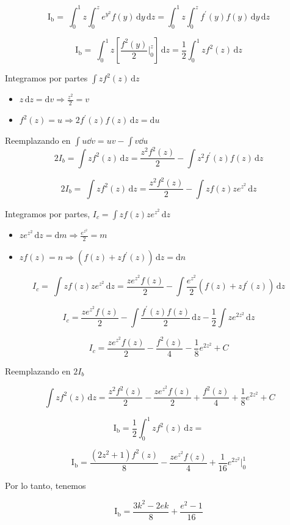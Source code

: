 {$$
\mathrm{I_b}= \ \int_{0}^{ 1 } z \int_{0}^{ z } e^{y^2} f(y) \,  \mathrm{d} y \,  \mathrm{d} z  =\int_0^1 z \int_0^z f^{'}(y)f(y)\, \mathrm{d} y \, \mathrm{d } z     
$$

$$ 
\mathrm{I_b}= \ \int_{0}^{ 1 } z \left[ \frac{f^2(y)}{2} \bigg \rvert_0^z \right]  \,  \mathrm{d} z  =\frac{1}{2}\int_0^1 z f^2(z)  \, \mathrm{d } z     
$$


Integramos por partes  $\displaystyle \int zf^2(z) \, \mathrm{d} z$
 \begin{itemize}
 	\item[] $z\, \mathrm{d} z=\mathrm{d} v\Rightarrow \frac{z^2}{2}=v$
 	\item[] $ f^2(z)=u \Rightarrow 2f^{'}(z) f(z) \, \mathrm{d} z =\mathrm{d}u$
 \end{itemize}

Reemplazando en $\int u \dd{v}=uv-\int v \dd{u}$
$$
2I_b= \int zf^2(z) \, \mathrm{d} z=\frac{z^2 f^2(z)}{2}- \int z^2 f^{'}(z) f(z) \, \mathrm{d} z 
$$

$$
2I_b=\ \int zf^2(z) \, \mathrm{d} z=\frac{z^2 f^2(z)}{2}- \int z f(z) z e^{z^2}  \, \mathrm{d} z 
$$ 

Integramos por partes, $\displaystyle I_c= \int z f(z) z e^{z^2} \, \mathrm{d} z$

 \begin{itemize}
	\item[] $z e^{z^2}\, \mathrm{d} z=\mathrm{d} m\Rightarrow \frac{ e^{z^2}}{2}=m$
	\item[] $zf(z)=n \Rightarrow (f(z)+zf^{'}(z))\, \mathrm{d} z =\mathrm{d}n$
\end{itemize}
 
$$
I_c=\ \int z f(z) z e^{z^2} \, \mathrm{d} z=\frac{ze^{z^2}f(z)}{2}-\int \frac{e^{z^2}}{2} \left(f(z)+zf^{'}(z) \right) \, \mathrm{d} z 
$$

$$
I_c=\frac{ze^{z^2}f(z)}{2}-\int \frac{f^{'}(z)f(z)}{2} \, \mathrm{d} z -\frac{1}{2} \int z e^{2z^2}  \, \mathrm{d} z 
$$

$$
I_c=\frac{ze^{z^2}f(z)}{2}- \frac{f^2(z)}{4}  -\frac{1}{8}  e^{2z^2} +C
$$

Reemplazando en $2I_b$

$$
\ \int zf^2(z) \, \mathrm{d} z=\frac{z^2 f^2(z)}{2}- \frac{ze^{z^2}f(z)}{2}+ \frac{f^2(z)}{4}  +\frac{1}{8}  e^{2z^2} +C
$$

$$ 
\mathrm{I_b}= \frac{1}{2}\int_0^1 z f^2(z)  \, \mathrm{d } z  =   
$$

$$ 
\mathrm{I_b}=   \frac{(2z^2+1) f^2(z)}{8}- \frac{ze^{z^2}f(z)}{4}  +\frac{1}{16} e^{2z^2} 
\bigg \rvert_0^1 
$$

Por lo tanto, tenemos

\begin{LnxRptaBox}
$$ 
\mathrm{I_b}=\frac{3k^2-2ek}{8}+\frac{e^2-1}{16}
$$
\end{LnxRptaBox}


}
